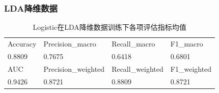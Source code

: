 \documentclass[10pt]{article}
\begin{document}
\subsubsection*{LDA降维数据}
\begin{table}[H]
  \centering
  \caption{Logistic在LDA降维数据训练下各项评估指标均值}
  \begin{tabular}{llll}
  \toprule
  Accuracy & Precision\_macro & Recall\_macro & F1\_macro \\
  0.8809 & 0.7675 & 0.6418 & 0.6801 \\
  \midrule
  AUC & Precision\_weighted & Recall\_weighted & F1\_weighted \\
  0.9426 & 0.8721 & 0.8809 & 0.8721 \\
  \bottomrule
  \end{tabular}
\end{table}
\end{document}

